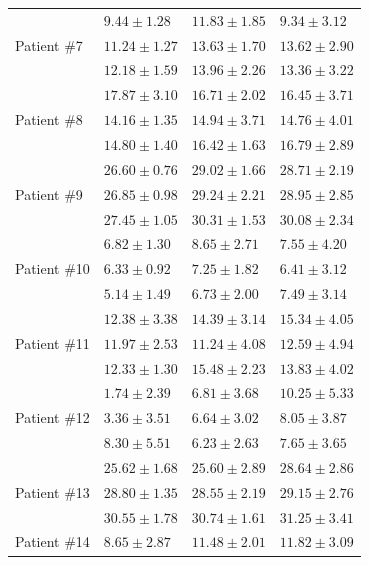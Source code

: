 \documentclass[journal,twoside,web]{ieeecolor}
\begin{document}
\begin{table}[h!]
\begin{tabular}{m{} m{} m{} m{}}
		\hline
		\multirow[t]{3}{*}{Patient \#7}   
		& $ 9.44 \pm 1.28$ & $11.83 \pm 1.85$ & $ 9.34 \pm 3.12$ \\ %
		& $11.24 \pm 1.27$ & $13.63 \pm 1.70$ & $13.62 \pm 2.90$ \\
		& $12.18 \pm 1.59$ & $13.96 \pm 2.26$ & $13.36 \pm 3.22$ \\
		\hline
		\multirow[t]{3}{*}{Patient \#8}   
		& $17.87 \pm 3.10$ & $16.71 \pm 2.02$ & $16.45 \pm 3.71$ \\ %
		& $14.16 \pm 1.35$ & $14.94 \pm 3.71$ & $14.76 \pm 4.01$ \\
		& $14.80 \pm 1.40$ & $16.42 \pm 1.63$ & $16.79 \pm 2.89$ \\
		\hline
		\multirow[t]{3}{*}{Patient \#9}   
		& $26.60 \pm 0.76$ & $29.02 \pm 1.66$ & $28.71 \pm 2.19$ \\ %
		& $26.85 \pm 0.98$ & $29.24 \pm 2.21$ & $28.95 \pm 2.85$ \\
		& $27.45 \pm 1.05$ & $30.31 \pm 1.53$ & $30.08 \pm 2.34$ \\
		\hline
		\multirow[t]{3}{*}{Patient \#10}
		& $ 6.82 \pm 1.30$ & $ 8.65 \pm 2.71$ & $ 7.55 \pm 4.20$ \\ %
		& $ 6.33 \pm 0.92$ & $ 7.25 \pm 1.82$ & $ 6.41 \pm 3.12$ \\
		& $ 5.14 \pm 1.49$ & $ 6.73 \pm 2.00$ & $ 7.49 \pm 3.14$ \\
		\hline
		\multirow[t]{3}{*}{Patient \#11}
		& $12.38 \pm 3.38$ & $14.39 \pm 3.14$ & $15.34 \pm 4.05$ \\ %
		& $11.97 \pm 2.53$ & $11.24 \pm 4.08$ & $12.59 \pm 4.94$ \\
		& $12.33 \pm 1.30$ & $15.48 \pm 2.23$ & $13.83 \pm 4.02$ \\
		\hline
		\multirow[t]{3}{*}{Patient \#12}
		& $ 1.74 \pm 2.39$ & $ 6.81 \pm 3.68$ & $10.25 \pm 5.33$ \\ %
		& $ 3.36 \pm 3.51$ & $ 6.64 \pm 3.02$ & $ 8.05 \pm 3.87$ \\
		& $ 8.30 \pm 5.51$ & $ 6.23 \pm 2.63$ & $ 7.65 \pm 3.65$ \\
		\hline
		\multirow[t]{3}{*}{Patient \#13}
		& $25.62 \pm 1.68$ & $25.60 \pm 2.89$ & $28.64 \pm 2.86$ \\ %
		& $28.80 \pm 1.35$ & $28.55 \pm 2.19$ & $29.15 \pm 2.76$ \\
		& $30.55 \pm 1.78$ & $30.74 \pm 1.61$ & $31.25 \pm 3.41$ \\
		\hline
		\multirow[t]{3}{*}{Patient \#14}
		& $ 8.65 \pm 2.87$ & $11.48 \pm 2.01$ & $11.82 \pm 3.09$ \\ %

\end{tabular}
\end{table}
\end{document}
